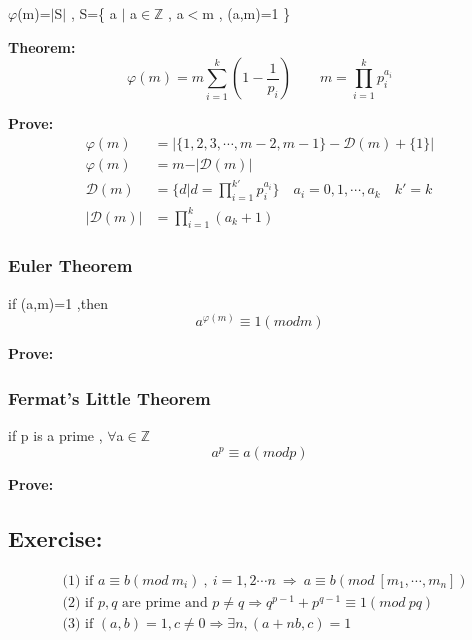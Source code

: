 \documentclass{ctexart}
\begin{document}
\(\varphi\)(m)=\(\vert\)S\(\vert\) , S=\{ a \(\vert\) a\(\in\)\(\mathbb{Z}\) , a$<$m , (a,m)=1 \}

\vspace{12 pt}
\textbf{Theorem:}
\\\[\varphi (m)=m\sum_{i=1}^{k}(1-\frac{1}{p_i})\qquad m=\prod_{i=1}^{k}{p_{i}^{a_i}}\]

\vspace{12 pt}
\textbf{Prove:}
\begin{align*}
\varphi (m)&=\vert \{1,2,3,\cdots ,m-2,m-1\} - \mathcal{D}(m)+\{1\}\vert \\
\varphi (m)&=m-\vert \mathcal{D}(m) \vert \\
\mathcal{D}(m)&=\{ d \vert d=\prod_{i=1}^{k'}{p_{i}^{a_i}} \}\quad a_i=0,1,\cdots ,a_k \quad k'=k\\
\vert \mathcal{D}(m) \vert &= \prod_{i=1}^{k}(a_k+1)
\end{align*}

\vspace{12 pt}
\subsubsection{Euler Theorem}

if (a,m)=1 ,then
\[a^{\varphi (m)}\equiv 1(mod m)\]

\textbf{Prove:}
\vspace{12 pt}
\subsubsection{Fermat's Little Theorem}

if p is a prime , \(\forall\)a\(\in\)\(\mathbb{Z}\)
\[a^p\equiv a(mod p)\]

\textbf{Prove:}
\vspace{12 pt}
\subsection{Exercise:}
\begin{align*}
&\text{(1) if }a\equiv b(mod\ m_i)\ ,\ i=1,2\cdots n\ \Rightarrow \ a\equiv b(mod\ [m_1,\cdots,m_n])\\
&\text{(2) if }p,q\text{ are prime and }p\neq q \Rightarrow q^{p-1}+p^{q-1}\equiv 1(mod\  pq)\\
&\text{(3) if }(a,b)=1,c\neq0 \Rightarrow \exists n,(a+nb,c)=1
\end{align*}
\end{document}
